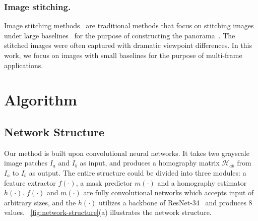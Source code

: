 \documentclass[runningheads]{llncs}
\begin{document}
\begin{figure*}[t!]
  \centering
  \hfill
\caption{The overall structure of our deep homography estimation network (a) and the triplet loss we design to train the network (b). In (a), two input patches $I_a$ and $I_b$ are fed into two branches consisting of feature extractor $f(\cdot)$ and mask predictor $m(\cdot)$ respectively, generating features $F_a, F_b$ and masks $M_a, M_b$. Then the features and masks are fed into a homography estimator to produce 8 values of the homography matrix $\mathcal{H}_{ab}$. In $h(\cdot)$, convolution blocks in various colors differ in the number of channels (detailed in Table~\ref{tab:net-layers}). To train the network in (a), we design a triplet loss composed of $\mathbf{L_n},\mathbf{L}$ as defined in Eq.~\ref{eq:l1-warp-Ia-Ib},~\ref{eq:l1-Ia-Ib} and~\ref{eq:tripleloss}.
  }\label{fig:network-structure}\end{figure*}
\subsubsection{Image stitching.}
Image stitching methods~\cite{zaragoza2013projective,lin2017direct} are traditional methods that focus on stitching images under large baselines~\cite{zhang2014parallax} for the purpose of constructing the panorama~\cite{brown2003recognising}. The stitched images were often captured with dramatic viewpoint differences. In this work, we focus on images with small baselines for the purpose of multi-frame applications. 



\section{Algorithm}\label{sec:algo}

\subsection{Network Structure}Our method is built upon convolutional neural networks. It takes two grayscale image patches $I_a$ and $I_b$ as input, and produces a homography matrix $\mathcal{H}_{ab}$ from $I_a$ to $I_b$ as output. The entire structure could be divided into three modules: a feature extractor $f(\cdot)$, a mask predictor $m(\cdot)$ and a homography estimator $h(\cdot)$. $f(\cdot)$ and $m(\cdot)$ are fully convolutional networks which accepts input of arbitrary sizes, and the $h(\cdot)$ utilizes a backbone of ResNet-34~\cite{he2016deep} and produces 8 values. \figurename~\ref{fig:network-structure}(a) illustrates the network structure. 
\end{document}
